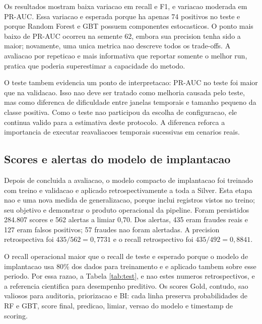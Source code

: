 \documentclass[10pt,twocolumn]{article}
\begin{document}
Os resultados mostram baixa variacao em recall e F1, e variacao moderada em PR-AUC. Essa variacao e esperada porque ha apenas 74 positivos no teste e porque Random Forest e GBT possuem componentes estocasticos. O ponto mais baixo de PR-AUC ocorreu na semente 62, embora sua precision tenha sido a maior; novamente, uma unica metrica nao descreve todos os trade-offs. A avaliacao por repeticao e mais informativa que reportar somente o melhor run, pratica que poderia superestimar a capacidade do metodo.

O teste tambem evidencia um ponto de interpretacao: PR-AUC no teste foi maior que na validacao. Isso nao deve ser tratado como melhoria causada pelo teste, mas como diferenca de dificuldade entre janelas temporais e tamanho pequeno da classe positiva. Como o teste nao participou da escolha de configuracao, ele continua valido para a estimativa deste protocolo. A diferenca reforca a importancia de executar reavaliacoes temporais sucessivas em cenarios reais.

\subsection{Scores e alertas do modelo de implantacao}

Depois de concluida a avaliacao, o modelo compacto de implantacao foi treinado com treino e validacao e aplicado retrospectivamente a toda a Silver. Esta etapa nao e uma nova medida de generalizacao, porque inclui registros vistos no treino; seu objetivo e demonstrar o produto operacional da pipeline. Foram persistidos 284.807 scores e 562 alertas a limiar 0,70. Dos alertas, 435 eram fraudes reais e 127 eram falsos positivos; 57 fraudes nao foram alertadas. A precision retrospectiva foi $435/562=0,7731$ e o recall retrospectivo foi $435/492=0,8841$.

O recall operacional maior que o recall de teste e esperado porque o modelo de implantacao usa 80\% dos dados para treinamento e e aplicado tambem sobre esse periodo. Por essa razao, a Tabela \ref{tab:test}, e nao estes numeros retrospectivos, e a referencia cientifica para desempenho preditivo. Os scores Gold, contudo, sao valiosos para auditoria, priorizacao e BI: cada linha preserva probabilidades de RF e GBT, score final, predicao, limiar, versao do modelo e timestamp de scoring.
\end{document}
